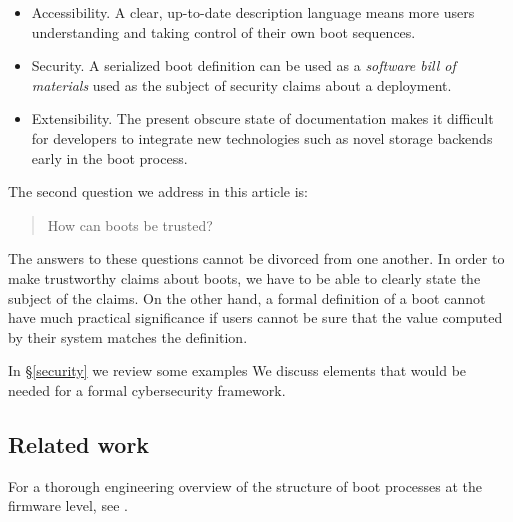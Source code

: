 \begin{itemize}
\tightlist
\item
  Accessibility. A clear, up-to-date description language means more
  users understanding and taking control of their own boot sequences.
\item
  Security. A serialized boot definition can be used as a \emph{software bill of materials} used as the subject of security claims about a deployment.
\item
  Extensibility. The present obscure state of documentation makes it difficult for developers to integrate new technologies such as novel storage backends early in the boot process.
\end{itemize}

The second question we address in this article is:
\begin{quote}
  How can boots be trusted?
\end{quote}

The answers to these questions cannot be divorced from one another.
%
In order to make trustworthy claims about boots, we have to be able to clearly state the subject of the claims.
%
On the other hand, a formal definition of a boot cannot have much practical significance if users cannot be sure that the value computed by their system matches the definition.

In \S\ref{security} we review some examples
%
We discuss elements that would be needed for a formal cybersecurity framework.


\subsection{Related work}\label{related-work}

For a thorough engineering overview of the structure of boot processes at the firmware level, see \cite{yao2020building}.

